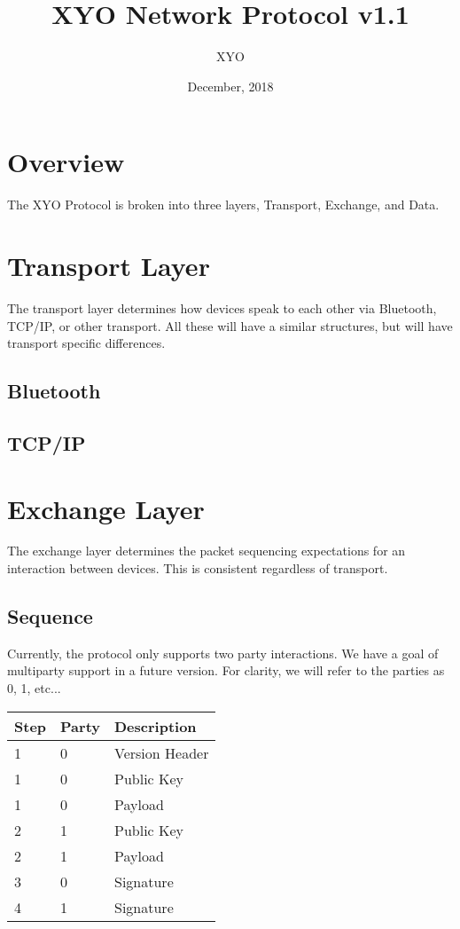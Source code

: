 \documentclass[11pt]{article}
\author{XYO}
\title{XYO Network Protocol v1.1}
\date{December, 2018}
\begin{document}
\maketitle


\section{Overview}
The XYO Protocol is broken into three layers, Transport, Exchange, and Data.

\section{Transport Layer}
The transport layer determines how devices speak to each other via Bluetooth, TCP/IP,
or other transport. All these will have a similar structures, but will have transport
specific differences.

\subsection{Bluetooth}

\subsection{TCP/IP}

\section{Exchange Layer}
The exchange layer determines the packet sequencing expectations for an interaction
between devices.  This is consistent regardless of transport.

\subsection{Sequence}
Currently, the protocol only supports two party interactions. We have a goal of multiparty 
support in a future version.  For clarity, we will refer to the parties as 0, 1, etc...

\begin{center}
\begin{tabular}{ |l|l|l| } 
\hline
\textbf{Step} & \textbf{Party} & \textbf{Description}\\
\hline

1 & 0 & Version Header \\
1 & 0 & Public Key \\
1 & 0 & Payload \\
2 & 1 & Public Key \\
2 & 1 & Payload \\
3 & 0 & Signature \\
4 & 1 & Signature \\

\hline
\end{tabular}
\end{center}
\end{document}
